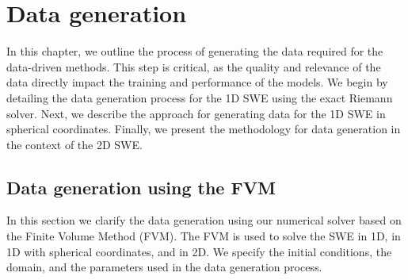 \chapter{Data generation}\label{ch:method}
In this chapter, we outline the process of generating the data required for the data-driven methods.
This step is critical, as the quality and relevance of the data directly impact the training and performance of the models.
We begin by detailing the data generation process for the 1D SWE using the exact Riemann solver.
Next, we describe the approach for generating data for the 1D SWE in spherical coordinates.
Finally, we present the methodology for data generation in the context of the 2D SWE.


\section{Data generation using the FVM}\label{sec:data_generation_fvm}
In this section we clarify the data generation using our numerical solver based on the Finite Volume Method (FVM).
The FVM is used to solve the SWE in 1D, in 1D with spherical coordinates, and in 2D.
We specify the initial conditions, the domain, and the parameters used in the data generation process.

